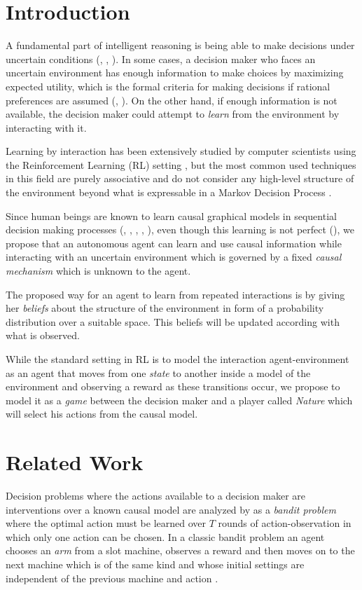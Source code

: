 \documentclass{article}
\begin{document}
\section{Introduction}
A fundamental part of intelligent reasoning is being able to make decisions under uncertain conditions (\cite{lake2017building}, \cite{danks2014unifying}, \cite{pearlwhy}). In some cases, a decision maker who faces an uncertain environment has enough information to make choices by maximizing expected utility, which is the formal criteria for making decisions if rational preferences are assumed (\cite{bernardo2000bayesian}, \cite{gilboa2009decision}). On the other hand, if enough information is not available, the decision maker could attempt to \textit{learn} from the environment by interacting with it.

Learning by interaction has been extensively studied by computer scientists using the Reinforcement Learning (RL) setting \cite{sutton1998reinforcement}, but the most common used techniques  in this field are purely associative and do not consider any high-level structure of the environment beyond what is expressable in a Markov Decision Process \cite{garnelo2016towards}.

Since human beings are known to learn causal graphical models in sequential decision making processes (\cite{sloman2006causal}, \cite{nichols2007decision}, \cite{meder2010observing}, \cite{hagmayer2013repeated}, \cite{danks2014unifying}), even though this learning is not perfect (\cite{rottman2014reasoning}), we propose that an autonomous agent can learn and use causal information while interacting with an uncertain environment which is governed by a fixed \textit{causal mechanism} which is unknown to the agent.  

The proposed way for an agent to learn from repeated interactions is by giving her \textit{beliefs} about the structure of the environment in form of a probability distribution over a suitable space. This beliefs will be updated according with what is observed.

While the standard setting in RL is to model the interaction agent-environment as an agent that moves from one \textit{state} to another inside a model of the environment and observing a reward as these transitions occur, we propose to model it as a \textit{game} between the decision maker and a player called \textit{Nature} which will select his actions from the causal model.

\section{Related Work}
Decision problems where the actions available to a decision maker are interventions over a known causal model are analyzed by \cite{lattimoreNIPS2016} as a \textit{bandit problem} where the optimal action must be learned over $T$ rounds of action-observation in which only one action can be chosen. In a classic bandit problem an agent chooses an \textit{arm} from a slot machine, observes a reward and then moves on to the next machine which is of the same kind and whose initial settings are independent of the previous machine and action \cite{sutton1998reinforcement}.
\end{document}
